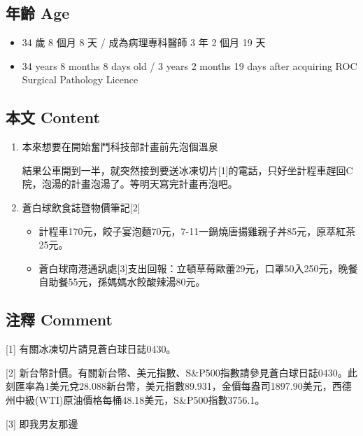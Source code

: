 \documentclass[a5paper, 10pt
]{book}
\providecommand{\tightlist}{%
  \setlength{\itemsep}{0pt}\setlength{\parskip}{0pt}}
\begin{document}
\hypertarget{ux5e74ux9f61-age-30}{%
\subsection{年齡 Age}\label{ux5e74ux9f61-age-30}}

\begin{itemize}
\tightlist
\item
  34 歲 8 個月 8 天 / 成為病理專科醫師 3 年 2 個月 19 天
\item
  34 years 8 months 8 days old / 3 years 2 months 19 days after
  acquiring ROC Surgical Pathology Licence
\end{itemize}

\hypertarget{ux672cux6587-content-30}{%
\subsection{本文 Content}\label{ux672cux6587-content-30}}

\begin{enumerate}
\def\labelenumi{\arabic{enumi}.}
\item
  本來想要在開始奮鬥科技部計畫前先泡個溫泉

  結果公車開到一半，就突然接到要送冰凍切片{[}1{]}的電話，只好坐計程車趕回C院，泡湯的計畫泡湯了。等明天寫完計畫再泡吧。
\item
  蒼白球飲食誌暨物價筆記{[}2{]}

  \begin{itemize}
  \tightlist
  \item
    計程車170元，餃子宴泡麵70元，7-11一鍋燒唐揚雞親子丼85元，原萃紅茶25元。
  \item
    蒼白球南港通訊處{[}3{]}支出回報：立頓草莓歐蕾29元，口罩50入250元，晚餐自助餐55元，孫媽媽水餃酸辣湯80元。
  \end{itemize}
\end{enumerate}

\hypertarget{ux6ce8ux91cb-comment-30}{%
\subsection{注釋 Comment}\label{ux6ce8ux91cb-comment-30}}

{[}1{]} 有關冰凍切片請見蒼白球日誌0430。

{[}2{]}
新台幣計價。有關新台幣、美元指數、S\&P500指數請參見蒼白球日誌0430。此刻匯率為1美元兌28.088新台幣，美元指數89.931，金價每盎司1897.90美元，西德州中級(WTI)原油價格每桶48.18美元，S\&P500指數3756.1。

{[}3{]} 即我男友那邊
\end{document}
